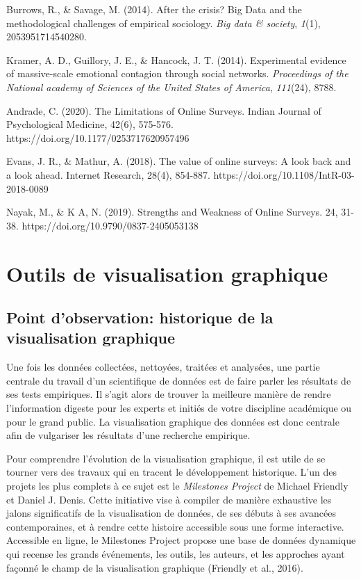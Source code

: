 \documentclass[
  letterpaper,
  DIV=11,
  numbers=noendperiod]{scrreprt}
\begin{document}
Burrows, R., \& Savage, M. (2014). After the crisis? Big Data and the
methodological challenges of empirical sociology. \emph{Big data \&
society}, \emph{1}(1), 2053951714540280.

Kramer, A. D., Guillory, J. E., \& Hancock, J. T. (2014). Experimental
evidence of massive-scale emotional contagion through social networks.
\emph{Proceedings of the National academy of Sciences of the United
States of America}, \emph{111}(24), 8788.

Andrade, C. (2020). The Limitations of Online Surveys. Indian Journal of
Psychological Medicine, 42(6), 575-576.
https://doi.org/10.1177/0253717620957496

\hfill\break
Evans, J. R., \& Mathur, A. (2018). The value of online surveys: A look
back and a look ahead. Internet Research, 28(4), 854-887.
https://doi.org/10.1108/IntR-03-2018-0089

\hfill\break
Nayak, M., \& K A, N. (2019). Strengths and Weakness of Online Surveys.
24, 31-38. https://doi.org/10.9790/0837-2405053138


\hypertarget{outils-de-visualisation-graphique}{%
\chapter{Outils de visualisation
graphique}\label{outils-de-visualisation-graphique}}

\hypertarget{point-dobservation-historique-de-la-visualisation-graphique}{%
\section{Point d'observation: historique de la visualisation
graphique}\label{point-dobservation-historique-de-la-visualisation-graphique}}

Une fois les données collectées, nettoyées, traitées et analysées, une
partie centrale du travail d'un scientifique de données est de faire
parler les résultats de ses tests empiriques. Il s'agit alors de trouver
la meilleure manière de rendre l'information digeste pour les experts et
initiés de votre discipline académique ou pour le grand public. La
visualisation graphique des données est donc centrale afin de vulgariser
les résultats d'une recherche empirique.

Pour comprendre l'évolution de la visualisation graphique, il est utile
de se tourner vers des travaux qui en tracent le développement
historique. L'un des projets les plus complets à ce sujet est le
\emph{Milestones Project} de Michael Friendly et Daniel J. Denis. Cette
initiative vise à compiler de manière exhaustive les jalons
significatifs de la visualisation de données, de ses débuts à ses
avancées contemporaines, et à rendre cette histoire accessible sous une
forme interactive. Accessible en ligne, le Milestones Project propose
une base de données dynamique qui recense les grands événements, les
outils, les auteurs, et les approches ayant façonné le champ de la
visualisation graphique (Friendly et al., 2016).
\end{document}
